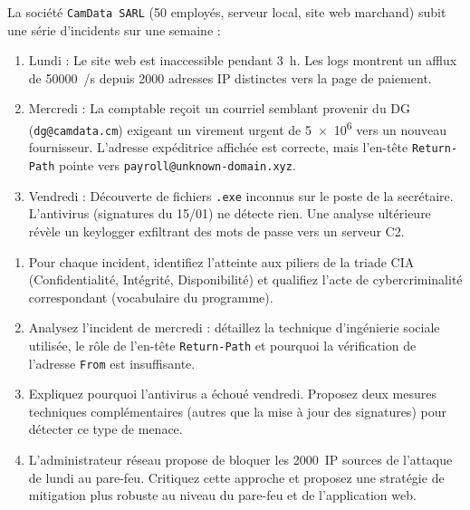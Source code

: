 \documentclass[11pt]{article}
\begin{document}
\begin{exercice}
La société \texttt{CamData SARL} (50 employés, serveur local, site web marchand) subit une série d'incidents sur une semaine :
\begin{enumerate}
    \item Lundi : Le site web est inaccessible pendant \SI{3}{\hour}. Les logs montrent un afflux de \SI{50000}{/\second} depuis \num{2000} adresses IP distinctes vers la page de paiement.
    \item Mercredi : La comptable reçoit un courriel semblant provenir du DG (\texttt{dg@camdata.cm}) exigeant un virement urgent de \SI{5e6}{} vers un nouveau fournisseur. L'adresse expéditrice affichée est correcte, mais l'en-tête \texttt{Return-Path} pointe vers \texttt{payroll@unknown-domain.xyz}.
    \item Vendredi : Découverte de fichiers \texttt{.exe} inconnus sur le poste de la secrétaire. L'antivirus (signatures du 15/01) ne détecte rien. Une analyse ultérieure révèle un keylogger exfiltrant des mots de passe vers un serveur C2.
\end{enumerate}
\begin{enumerate}
    \item Pour chaque incident, identifiez l'atteinte aux piliers de la triade CIA (Confidentialité, Intégrité, Disponibilité) et qualifiez l'acte de cybercriminalité correspondant (vocabulaire du programme).
    \item Analysez l'incident de mercredi : détaillez la technique d'ingénierie sociale utilisée, le rôle de l'en-tête \texttt{Return-Path} et pourquoi la vérification de l'adresse \texttt{From} est insuffisante.
    \item Expliquez pourquoi l'antivirus a échoué vendredi. Proposez deux mesures techniques complémentaires (autres que la mise à jour des signatures) pour détecter ce type de menace.
    \item L'administrateur réseau propose de bloquer les \SI{2000}{IP} sources de l'attaque de lundi au pare-feu. Critiquez cette approche et proposez une stratégie de mitigation plus robuste au niveau du pare-feu et de l'application web.
\end{enumerate}
\end{exercice}
\end{document}
